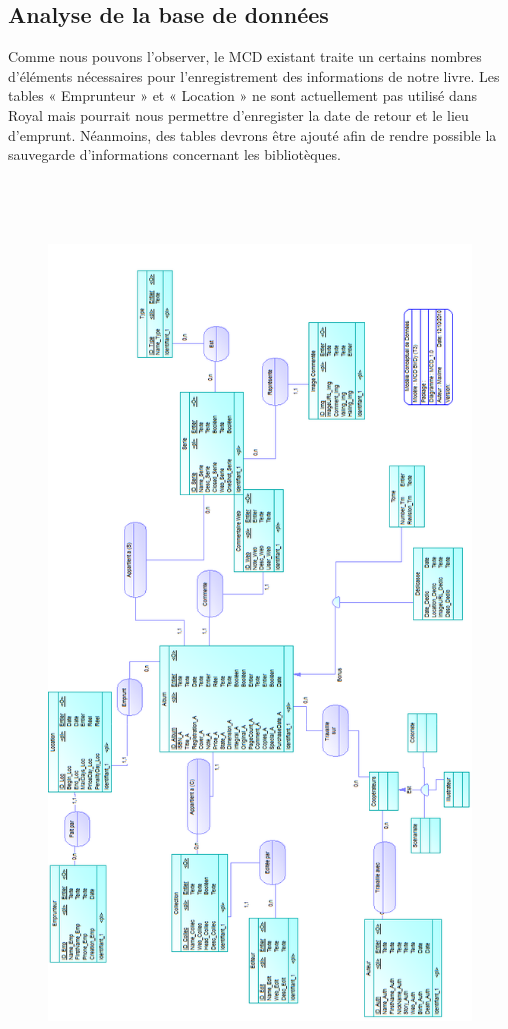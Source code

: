 \subsection{Analyse de la base de données}

Comme nous pouvons l'observer, le MCD existant traite un certains nombres d'éléments nécessaires pour l'enregistrement des informations de notre livre.
Les tables « Emprunteur » et « Location » ne sont actuellement pas utilisé dans Royal mais pourrait nous permettre d'enregister la date de retour et le lieu d'emprunt.
Néanmoins, des tables devrons être ajouté afin de rendre possible la sauvegarde d'informations concernant les bibliotèques.


\begin{figure}[hp]
 \centering
 \includegraphics[height=24cm]{../img/MCD_Royal.png}
\end{figure}

